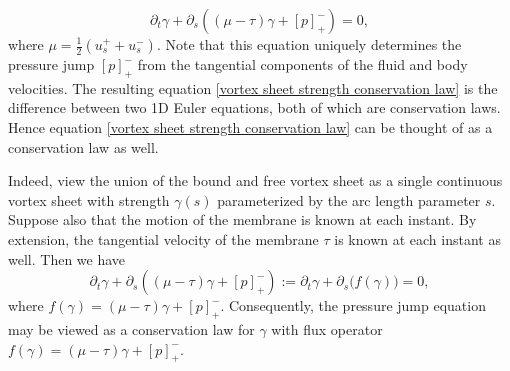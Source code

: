 \documentclass{article}[12pt]
\theoremstyle{Theorem}
\begin{document}
\begin{equation}
    \partial_t\gamma + \partial_s((\mu - \tau)\gamma + [p]_{+}^{-})=0,
    \label{vortex sheet strength conservation law}
\end{equation}
where $\mu = \frac{1}{2}(u_s^+ + u_s^-)$. Note that this equation uniquely determines the pressure jump $[p]^-_+$ from the tangential components of the fluid and body velocities. The resulting equation \eqref{vortex sheet strength conservation law} is the difference between two 1D Euler equations, both of which are conservation laws. Hence equation \eqref{vortex sheet strength conservation law} can be thought of as a conservation law as well.
\newline

Indeed, view the union of the bound and free vortex sheet as a single continuous vortex sheet with strength $\gamma(s)$ parameterized by the arc length parameter $s$. Suppose also that the motion of the membrane is known at each instant. By extension, the tangential velocity of the membrane $\tau$ is known at each instant as well. Then we have
\begin{equation}
    \partial_t\gamma + \partial_s((\mu - \tau)\gamma + [p]_{+}^{-}):= \partial_t\gamma + \partial_s\big(f(\gamma)\big)=0,
    \label{vortex sheet strength conservation law in flux form}
\end{equation}
where $f(\gamma) = (\mu - \tau)\gamma + [p]^-_+$. Consequently, the pressure jump equation may be viewed as a conservation law for $\gamma$ with flux operator $f(\gamma)= (\mu-\tau)\gamma +[p]^-_+$.
\newline
\end{document}
